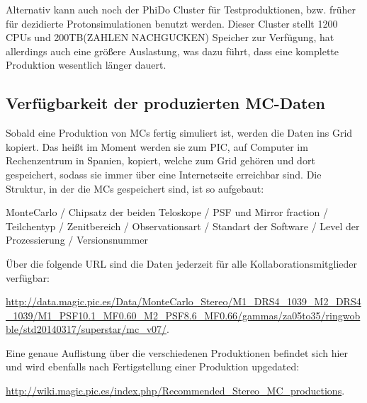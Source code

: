 Alternativ kann auch noch der PhiDo Cluster für Testproduktionen, bzw. früher für dezidierte Protonsimulationen benutzt werden. 
Dieser Cluster stellt 1200 CPUs und 200TB(ZAHLEN NACHGUCKEN) Speicher zur Verfügung, hat allerdings auch eine größere Auslastung, was dazu führt, dass eine komplette Produktion wesentlich länger dauert.



\subsection{Verfügbarkeit der produzierten MC-Daten}
\label{sec:Wenn die MCs fertig sind}
Sobald eine Produktion von MCs fertig simuliert ist, werden die Daten ins Grid kopiert.
Das heißt im Moment werden sie zum PIC, auf Computer im Rechenzentrum in Spanien, kopiert, welche zum Grid gehören und dort gespeichert, sodass sie immer über eine Internetseite erreichbar sind.
Die Struktur, in der die MCs gespeichert sind, ist so aufgebaut:\newline 

MonteCarlo / Chipsatz der beiden Teloskope / PSF und Mirror fraction / Teilchentyp / Zenitbereich / Observationsart / Standart der Software / Level der Prozessierung / Versionsnummer \newline

Über die folgende URL sind die Daten jederzeit für alle Kollaborationsmitglieder verfügbar:

\url{http://data.magic.pic.es/Data/MonteCarlo_Stereo/M1_DRS4_1039_M2_DRS4_1039/M1_PSF10.1_MF0.60_M2_PSF8.6_MF0.66/gammas/za05to35/ringwobble/std20140317/superstar/mc_v07/}.

Eine genaue Auflistung über die verschiedenen Produktionen befindet sich hier und wird ebenfalls nach Fertigstellung einer Produktion upgedated:

\url{http://wiki.magic.pic.es/index.php/Recommended_Stereo_MC_productions}.


